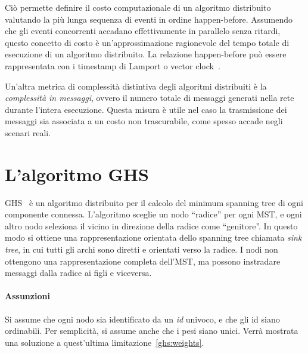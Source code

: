 \documentclass[target=bach,aauheader=,style=]{thud}
\newcommand{\eng}[1]{\foreignlanguage{english}{#1}}
\begin{document}
Ciò permette definire il costo computazionale di un algoritmo distribuito valutando la più lunga sequenza di eventi in ordine \eng{happen-before}. Assumendo che gli eventi concorrenti accadano effettivamente in parallelo senza ritardi, questo concetto di costo è un'approssimazione ragionevole del tempo totale di esecuzione di un algoritmo distribuito. La relazione \eng{happen-before} può essere rappresentata con i \eng{timestamp} di Lamport o \eng{vector clock}~\cite{10.1145/359545.359563}.
\bigskip

Un'altra metrica di complessità distintiva degli algoritmi distribuiti è la \emph{complessità in messaggi}, ovvero il numero totale di messaggi generati nella rete durante l'intera esecuzione. Questa misura è utile nel caso la trasmissione dei messaggi sia associata a un costo non trascurabile, come spesso accade negli scenari reali.

\section{L'algoritmo GHS}
GHS~\cite{10.1145/357195.357200} è un algoritmo distribuito per il calcolo del \eng{minimum spanning tree} di ogni componente connessa. L'algoritmo sceglie un nodo ``radice'' per ogni MST, e ogni altro nodo seleziona il vicino in direzione della radice come ``genitore''. In questo modo si ottiene una rappresentazione orientata dello \eng{spanning tree} chiamata \emph{\eng{sink tree}}, in cui tutti gli archi sono diretti e orientati verso la radice. I nodi non ottengono una rappresentazione completa dell'MST, ma possono instradare messaggi dalla radice ai figli e viceversa.

\paragraph{Assunzioni}\label{mst:assumptions}
Si assume che ogni nodo sia identificato da un \emph{id} univoco, e che gli id siano ordinabili. Per semplicità, si assume anche che i pesi siano unici. Verrà mostrata una soluzione a quest'ultima limitazione~\ref{ghs:weights}.
\bigskip
\end{document}
